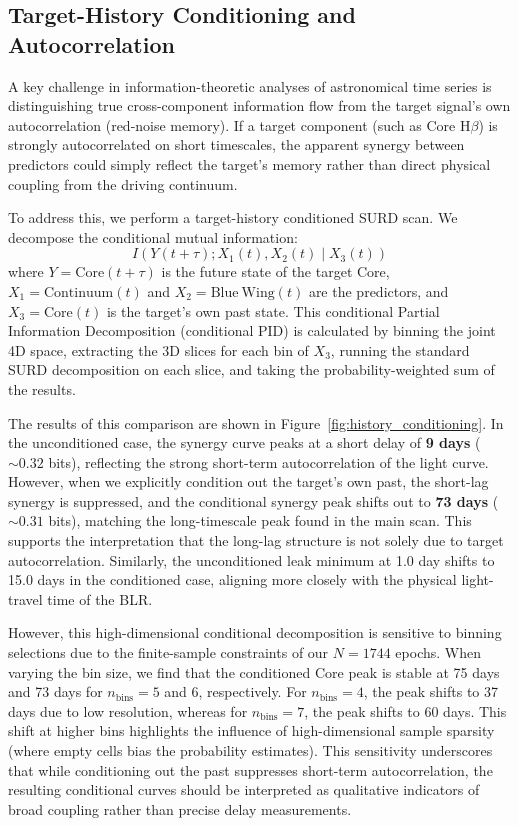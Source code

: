 \documentclass[fleqn,usenatbib]{mnras}
\begin{document}
\subsection{Target-History Conditioning and Autocorrelation}
\label{sec:target_history_conditioning}

A key challenge in information-theoretic analyses of astronomical time series is distinguishing true cross-component information flow from the target signal's own autocorrelation (red-noise memory). If a target component (such as Core H\(\beta\)) is strongly autocorrelated on short timescales, the apparent synergy between predictors could simply reflect the target's memory rather than direct physical coupling from the driving continuum.

To address this, we perform a target-history conditioned SURD scan. We decompose the conditional mutual information:
\begin{equation}
I(Y(t+\tau); X_1(t), X_2(t) \mid X_3(t))
\end{equation}
where $Y = \mathrm{Core}(t+\tau)$ is the future state of the target Core, $X_1 = \mathrm{Continuum}(t)$ and $X_2 = \mathrm{Blue\ Wing}(t)$ are the predictors, and $X_3 = \mathrm{Core}(t)$ is the target's own past state. This conditional Partial Information Decomposition (conditional PID) is calculated by binning the joint 4D space, extracting the 3D slices for each bin of $X_3$, running the standard SURD decomposition on each slice, and taking the probability-weighted sum of the results.

The results of this comparison are shown in Figure~\ref{fig:history_conditioning}. In the unconditioned case, the synergy curve peaks at a short delay of \textbf{9 days} ($\sim 0.32$ bits), reflecting the strong short-term autocorrelation of the light curve. However, when we explicitly condition out the target's own past, the short-lag synergy is suppressed, and the conditional synergy peak shifts out to \textbf{73 days} ($\sim 0.31$ bits), matching the long-timescale peak found in the main scan. This supports the interpretation that the long-lag structure is not solely due to target autocorrelation. Similarly, the unconditioned leak minimum at 1.0 day shifts to 15.0 days in the conditioned case, aligning more closely with the physical light-travel time of the BLR.

However, this high-dimensional conditional decomposition is sensitive to binning selections due to the finite-sample constraints of our $N = 1744$ epochs. When varying the bin size, we find that the conditioned Core peak is stable at 75 days and 73 days for $n_{\mathrm{bins}} = 5$ and $6$, respectively. For $n_{\mathrm{bins}} = 4$, the peak shifts to 37 days due to low resolution, whereas for $n_{\mathrm{bins}} = 7$, the peak shifts to 60 days. This shift at higher bins highlights the influence of high-dimensional sample sparsity (where empty cells bias the probability estimates). This sensitivity underscores that while conditioning out the past suppresses short-term autocorrelation, the resulting conditional curves should be interpreted as qualitative indicators of broad coupling rather than precise delay measurements.
\end{document}
